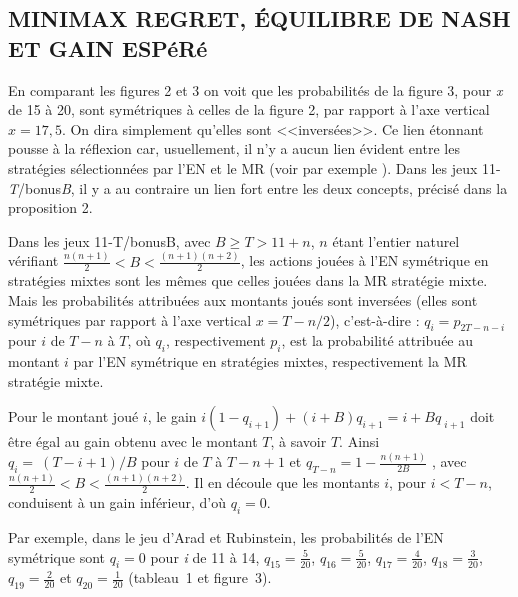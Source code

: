 \begin{Article}
\begin{refsection}[UmbhauerFR]
\section{MINIMAX REGRET, ÉQUILIBRE DE NASH ET GAIN ESPéRé}
\label{section:Minimax Reg équilibre}

En comparant les figures 2 et 3 on voit que les probabilités de la
figure 3, pour \emph{x} de 15 à 20, sont symétriques à celles de la
figure 2, par rapport à l'axe vertical \(x = 17,5\). On dira simplement
qu'elles sont <<inversées>>. Ce lien étonnant pousse à la réflexion car,
usuellement, il n'y a aucun lien évident entre les stratégies
sélectionnées par l'EN et le MR (voir par exemple \textcite{umbhauer2022}).
Dans les jeux 11-\emph{T}/bonus\emph{B}, il y a au contraire un lien
fort entre les deux concepts, précisé dans la proposition 2.


\begin{proposition}
Dans les jeux 11-T/bonusB, avec \(B \geq T > 11 + n\), $n$ étant l'entier naturel vérifiant \(\frac{n(n + 1)}{2} < B < \frac{(n + 1)(n + 2)}{2}\), les actions
jouées à l'EN symétrique en stratégies mixtes sont les mêmes que celles
jouées dans la MR stratégie mixte. Mais les probabilités attribuées aux
montants joués sont inversées (elles sont symétriques par rapport à
l'axe vertical \(x = T - n/2\)), c'est-à-dire :
\(q_{i} = p_{2T - n - i}\) pour $i$ de \(T - n\) à $T$, où
$q_i$, respectivement $p_i$, est la
probabilité attribuée au montant $i$ par l'EN symétrique en stratégies
mixtes, respectivement la MR stratégie mixte.   
\end{proposition}

\begin{demonstration}
    Pour le montant joué $i$, le gain
\(i(1 - q_{i + 1}) + (i + B)q_{i + 1} = i + B{q\ }_{i + 1}\) doit être
égal au gain obtenu avec le montant $T$, à savoir $T$. Ainsi
\(q_{i} = \ (T - i + 1)/B\) pour $i$ de $T$ à \(T - n + 1\) et
\(q_{T - n} = 1 - \frac{n(n + 1)}{2B}\) , avec
\(\frac{n(n + 1)}{2} < B < \frac{(n + 1)(n + 2)}{2}\). Il en découle que
les montants $i$, pour \(i < T - n\), conduisent à un gain
inférieur, d'où \(q_{i} = 0\). \quad \blacksquare
\end{demonstration}

Par exemple, dans le jeu d'Arad et Rubinstein, les probabilités de l'EN
symétrique sont \(q_{i} = 0\) pour \emph{i} de 11 à
14, $q_{15} = \frac{5}{20}$, $q_{16} = \frac{5}{20}$, $q_{17} = \frac{4}{20}$, $q_{18} = \frac{3}{20}$, $q_{19} = \frac{2}{20}$ et $q_{20} = \frac{1}{20}$ (tableau~1 et figure~3).


\end{refsection}
\end{Article}
